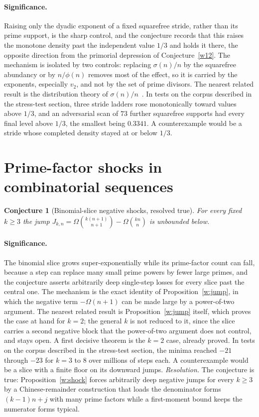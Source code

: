 \documentclass[11pt]{article}
\newtheorem{conjecture}{Conjecture}
\theoremstyle{definition}
\begin{document}
\paragraph{Significance.}
Raising only the dyadic exponent of a fixed squarefree stride, rather than its prime support, is the sharp control, and the conjecture records that this raises the monotone density past the independent value $1/3$ and holds it there, the opposite direction from the primorial depression of Conjecture~\ref{w12}.  The mechanism is isolated by two controls: replacing $\sigma(n)/n$ by the squarefree abundancy or by $n/\phi(n)$ removes most of the effect, so it is carried by the exponents, especially $v_2$, and not by the set of prime divisors.  The nearest related result is the distribution theory of $\sigma(n)/n$~\cite{Ten}.  In tests on the corpus described in the stress-test section, three stride ladders rose monotonically toward values above $1/3$, and an adversarial scan of $73$ further squarefree supports had every final level above $1/3$, the smallest being $0.3341$.  A counterexample would be a stride whose completed density stayed at or below $1/3$.

\section{Prime-factor shocks in combinatorial sequences}

\begin{conjecture}[Binomial-slice negative shocks, resolved true]\label{w14}
For every fixed $k\ge3$ the jump $J_{k,n}=\Omega\binom{k(n+1)}{n+1}-\Omega\binom{kn}{n}$ is unbounded below.
\end{conjecture}

\paragraph{Significance.}
The binomial slice grows super-exponentially while its prime-factor count can fall, because a step can replace many small prime powers by fewer large primes, and the conjecture asserts arbitrarily deep single-step losses for every slice past the central one.  The mechanism is the exact identity of Proposition~\ref{w:jump}, in which the negative term $-\Omega(n+1)$ can be made large by a power-of-two argument.  The nearest related result is Proposition~\ref{w:jump} itself, which proves the case at hand for $k=2$; the general $k$ is not reduced to it, since the slice carries a second negative block that the power-of-two argument does not control, and stays open.  A first decisive theorem is the $k=2$ case, already proved.  In tests on the corpus described in the stress-test section, the minima reached $-21$ through $-23$ for $k=3$ to $8$ over millions of steps each.  A counterexample would be a slice with a finite floor on its downward jumps.  \emph{Resolution.} The conjecture is true: Proposition~\ref{w:shock} forces arbitrarily deep negative jumps for every $k\ge3$ by a Chinese-remainder construction that loads the denominator forms $(k-1)n+j$ with many prime factors while a first-moment bound keeps the numerator forms typical.
\end{document}
